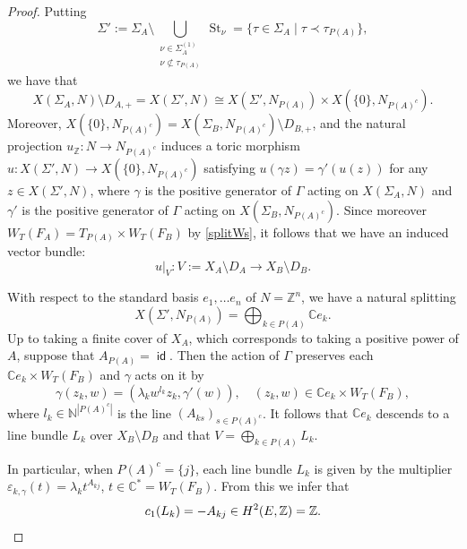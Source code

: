 \documentclass[JEP,XML,SOM,Unicode,NoFloatCountersInSection]{cedram}
\theoremstyle{definition}
\let\epsilon\varepsilon
\DeclareMathOperator{\St}{St}
\let\la\lambda
\let\sminus\setminus
\newcommand{\CC}{\mathbb{C}}
\newcommand{\NN}{\mathbb{N}}
\newcommand{\ZZ}{\mathbb{Z}}
\DeclareMathOperator{\id}{\mathsf{id}}
\begin{document}
\begin{proof}
Putting
\begin{equation*}
\Sigma':=\Sigma_A\sminus \bigcup_{\substack{\nu\in\Sigma_A^{(1)}\\ \nu\not\subset\tau_{P(A)}}}\St_\nu=\{\tau\in\Sigma_A\mid\tau\prec\tau_{P(A)}\},
\end{equation*}
we have that
\begin{equation*}
X(\Sigma_A, N)\sminus D_{A,+}=X(\Sigma',N)\cong X(\Sigma', N_{P(A)})\times X(\{0\},N_{P(A)^c}).
\end{equation*}
Moreover, $X(\{0\},N_{P(A)^c})=X(\Sigma_B,N_{P(A)^c})\sminus D_{B,+}$, and the natural projection $u_\ZZ:N\to N_{P(A)^c}$ induces a toric morphism $u:X(\Sigma',N)\to X(\{0\},N_{P(A)^c})$ satisfying $u(\gamma z)=\gamma'(u(z))$ for any $z\in X(\Sigma',N)$, where $\gamma$ is the positive generator of $\Gamma$ acting on $X(\Sigma_A,N)$ and $\gamma'$ is the positive generator of $\Gamma$ acting on $X(\Sigma_B,N_{P(A)^c})$. Since moreover $W_T(F_A)=T_{P(A)}\times W_T(F_B)$ by \ref{splitWs}, it follows that we have an induced vector bundle:
\begin{equation*}
u|_V:V:=X_A\sminus D_A\to X_B\sminus D_B.
\end{equation*}

With respect to the standard basis $e_1,\ldots e_n$ of $N=\ZZ^n$, we have a natural splitting
\begin{equation*}
X(\Sigma',N_{P(A)})=\bigoplus_{k\in P(A)}\CC e_k.
\end{equation*}
Up to taking a finite cover of $X_A$, which corresponds to taking a positive power of $A$, suppose that $A_{P(A)}=\id$. Then the action of $\Gamma$ preserves each $\CC e_k\times W_T(F_B)$ and $\gamma$ acts on it by
\begin{equation*}
\gamma(z_k,w)=(\la_k w^{l_k}z_k,\gamma'(w)), \quad (z_k,w)\in\CC e_k\times W_T(F_B),
\end{equation*}
where $l_k\in\NN^{|P(A)^c|}$ is the line $(A_{ks})_{s\in P(A)^c}$. It follows that $\CC e_k$ descends to a line bundle $L_k$ over $X_B\sminus D_B$ and that $V=\bigoplus_{k\in P(A)} L_k$.

In particular, when $P(A)^c=\{j\}$, each line bundle $L_k$ is given by the multiplier $\epsilon_{k,\gamma}(t)=\la_k t^{A_{kj}}$, $t\in\CC^*=W_T(F_B)$. From this we infer that
\begin{equation*}
c_1(L_k)=-A_{kj}\in H^2(E,\ZZ)=\ZZ.\qedhere
\end{equation*}
\end{proof}
\end{document}
